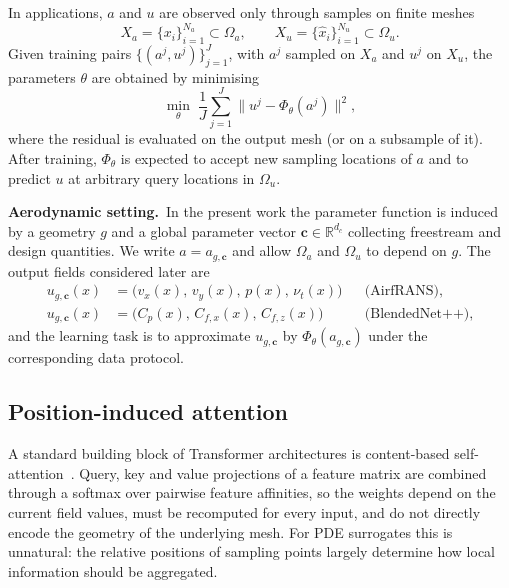 \documentclass[final,3p,times]{elsarticle}
\begin{document}
In applications, $a$ and $u$ are observed only through samples on finite meshes
\begin{equation}
  X_{a}
  =
  \{x_{i}\}_{i=1}^{N_{a}}
  \subset
  \Omega_{a},
  \qquad
  X_{u}
  =
  \{\hat{x}_{i}\}_{i=1}^{N_{u}}
  \subset
  \Omega_{u}.
  \label{eq:meshes}
\end{equation}
Given training pairs $\{(a^{j},u^{j})\}_{j=1}^{J}$, with $a^{j}$ sampled on $X_{a}$ and $u^{j}$ on $X_{u}$, the parameters $\theta$ are obtained by minimising
\begin{equation}
  \min_{\theta}\;
  \frac{1}{J}
  \sum_{j=1}^{J}
  \bigl\|
    u^{j}
    -
    \Phi_{\theta}(a^{j})
  \bigr\|^{2},
  \label{eq:emp_risk}
\end{equation}
where the residual is evaluated on the output mesh (or on a subsample of it). After training, $\Phi_{\theta}$ is expected to accept new sampling locations of $a$ and to predict $u$ at arbitrary query locations in $\Omega_{u}$.

\noindent\textbf{Aerodynamic setting.}\ 
In the present work the parameter function is induced by a geometry $g$ and a global parameter vector $\mathbf{c}\in\mathbb{R}^{d_{c}}$ collecting freestream and design quantities. We write $a=a_{g,\mathbf{c}}$ and allow $\Omega_{a}$ and $\Omega_{u}$ to depend on $g$. The output fields considered later are
\begin{align}
  u_{g,\mathbf{c}}(x)
  &=
  \bigl(v_{x}(x),\, v_{y}(x),\, p(x),\, \nu_{t}(x)\bigr)
  &&
  \text{(AirfRANS)},
  \label{eq:airfrans_target}\\
  u_{g,\mathbf{c}}(x)
  &=
  \bigl(C_{p}(x),\, C_{f,x}(x),\, C_{f,z}(x)\bigr)
  &&
  \text{(BlendedNet++)},
  \label{eq:bwb_target}
\end{align}
and the learning task is to approximate $u_{g,\mathbf{c}}$ by $\Phi_{\theta}(a_{g,\mathbf{c}})$ under the corresponding data protocol.

\subsection{Position-induced attention}
\label{sec:posatt}
A standard building block of Transformer architectures is content-based self-attention~\cite{vaswani2017attention}. Query, key and value projections of a feature matrix are combined through a softmax over pairwise feature affinities, so the weights depend on the current field values, must be recomputed for every input, and do not directly encode the geometry of the underlying mesh. For PDE surrogates this is unnatural: the relative positions of sampling points largely determine how local information should be aggregated.
\end{document}
